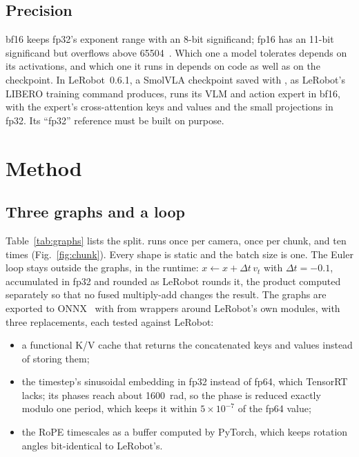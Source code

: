 \documentclass[conference]{IEEEtran}
\newcommand{\sci}[2]{\ensuremath{#1{\times}10^{#2}}}
\begin{document}
\subsection{Precision}
bf16 keeps fp32's exponent range with an 8-bit significand; fp16 has an 11-bit significand but overflows above 65504~\cite{kalamkar2019bf16,micikevicius2018mixed}. Which one a model tolerates depends on its activations, and which one it runs in depends on code as well as on the checkpoint. In LeRobot~0.6.1, a SmolVLA checkpoint saved with , as LeRobot's LIBERO training command produces, runs its VLM and action expert in bf16, with the expert's cross-attention keys and values and the small projections in fp32. Its ``fp32'' reference must be built on purpose.

\section{Method}
\label{sec:method}

\subsection{Three graphs and a loop}
Table~\ref{tab:graphs} lists the split.  runs once per camera,  once per chunk, and  ten times (Fig.~\ref{fig:chunk}). Every shape is static and the batch size is one. The Euler loop stays outside the graphs, in the runtime: $x \leftarrow x + \Delta t\, v_t$ with $\Delta t = -0.1$, accumulated in fp32 and rounded as LeRobot rounds it, the product computed separately so that no fused multiply-add changes the result. The graphs are exported to ONNX~\cite{onnx} with  from wrappers around LeRobot's own modules, with three replacements, each tested against LeRobot:
\begin{itemize}
\item a functional K/V cache that returns the concatenated keys and values instead of storing them;
\item the timestep's sinusoidal embedding in fp32 instead of fp64, which TensorRT lacks; its phases reach about 1600~rad, so the phase is reduced exactly modulo one period, which keeps it within \sci{5}{-7} of the fp64 value;
\item the RoPE timescales as a buffer computed by PyTorch, which keeps rotation angles bit-identical to LeRobot's.
\end{itemize}
\end{document}
